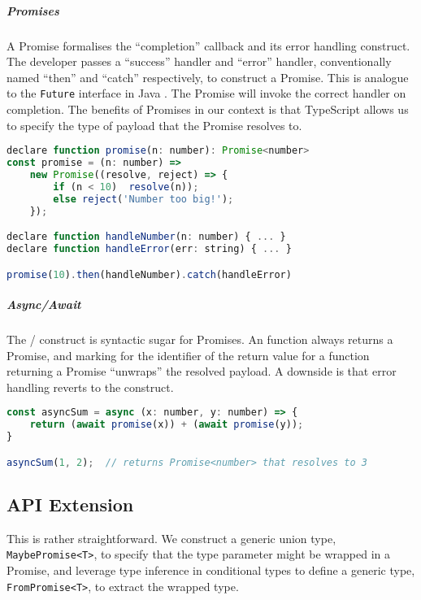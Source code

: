 \subparagraph{Promises}
A Promise formalises the ``completion'' callback
and its error handling construct. The developer passes a ``success''
handler and ``error'' handler, conventionally named
``then'' and ``catch'' respectively, to construct a Promise.
This is analogue to the \texttt{Future} interface in Java \cite{JavaFuture}.
The Promise will invoke the correct handler on completion.
The benefits of Promises in our context is that TypeScript allows
us to specify the type of payload that the Promise resolves to.

\begin{lstlisting}[language=javascript,numbers=none]
declare function promise(n: number): Promise<number>
const promise = (n: number) => 
	new Promise((resolve, reject) => {
		if (n < 10)  resolve(n));
		else reject('Number too big!');
	});

declare function handleNumber(n: number) { ... } 
declare function handleError(err: string) { ... }

promise(10).then(handleNumber).catch(handleError)
\end{lstlisting}

\subparagraph{Async/Await}
The / construct
is syntactic sugar for Promises. An 
function always returns a Promise, and marking 
for the identifier of the return value for a function returning a Promise
``unwraps'' the resolved payload. A downside is that error handling
reverts to the  construct.

\begin{lstlisting}[language=javascript,numbers=none]
const asyncSum = async (x: number, y: number) => {
	return (await promise(x)) + (await promise(y));
}

asyncSum(1, 2);  // returns Promise<number> that resolves to 3
\end{lstlisting}

\subsection{API Extension}
\label{subsection:asyncapi}

This is rather straightforward.
We construct a generic union type, \texttt{MaybePromise<T>},
to specify that the type parameter might be wrapped in a Promise,
and leverage type inference in conditional types to
define a generic type, \texttt{FromPromise<T>}, to extract
the wrapped type.


